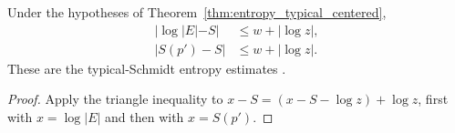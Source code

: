 \begin{theorem}
\label{thm:entropy_typical_spectrum}
\leanok
{}
Under the hypotheses of Theorem~\ref{thm:entropy_typical_centered},
\begin{align}
 |\log|E|-S|&\le w+|\log z|,
 \label{eq:entropy_typical_card_bound}\\
 |S(p')-S|&\le w+|\log z|.
 \label{eq:entropy_typical_entropy_bound}
\end{align}
These are the typical-Schmidt entropy estimates
\cite[Section~8]{OpenAI2026AreaLaw}.
\end{theorem}
\begin{proof}
\leanok
{}
Apply the triangle inequality to
$x-S=(x-S-\log z)+\log z$, first with $x=\log|E|$ and then with $x=S(p')$.
\end{proof}
